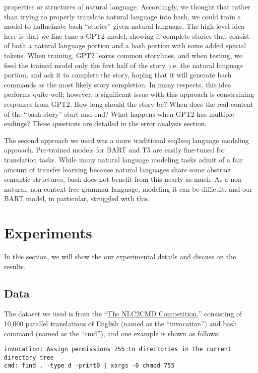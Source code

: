 \documentclass{article}
\begin{document}
properties or structures of natural language. Accordingly, we thought that
rather than trying to properly translate natural language into bash, we could
train a model to hallucinate bash ``stories'' given natural language. The
high-level idea here is that we fine-tune a GPT2 model, showing it complete
stories that consist of both a natural language portion and a bash portion with
some added special tokens. When training, GPT2 learns common storylines,
and when testing, we feed the trained model only the first half of the
story, i.e. the natural language portion, and ask it to complete the story,
hoping that it will generate bash commands as the most likely story completion.
In many respects, this idea performs quite well; however, a significant issue
with this approach is constraining responses from GPT2. How long should the
story be? When does the real content of the ``bash story'' start and end? What
happens when GPT2 has multiple endings? These questions are detailed in the
error analysis section.
\par
The second approach we used was a more traditional seq2seq language modeling
approach. Pre-trained models for BART and T5 are easily fine-tuned for
translation tasks. While many natural language modeling tasks admit of a fair
amount of transfer learning because natural languages share some abstract
semantic structures, bash does not benefit from this nearly as much. As a
non-natural, non-context-free grammar language, modeling it can be difficult,
and our BART model, in particular, struggled with this.

\section{Experiments}
In this section, we will show the our experimental details and discuss on the results.

\subsection{Data}
The dataset we used is from the
``\href{https://nlc2cmd.us-east.mybluemix.net/}{The NLC2CMD Competition},''
consisting of 10,000 parallel translations of English (named as the
``invocation'') and bash command (named as the ``cmd''), and one example is
shown as follows:

\begin{verbatim}
invocation: Assign permissions 755 to directories in the current directory tree
cmd: find . -type d -print0 | xargs -0 chmod 755
\end{verbatim}
\end{document}
